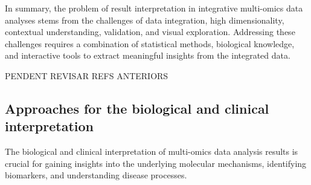 \documentclass[a4paper, nobind]{templates/ociamthesis}
\begin{document}
In summary, the problem of result interpretation in integrative multi-omics data analyses stems from the challenges of data integration, high dimensionality, contextual understanding, validation, and visual exploration. Addressing these challenges requires a combination of statistical methods, biological knowledge, and interactive tools to extract meaningful insights from the integrated data.

PENDENT REVISAR REFS ANTERIORS

\hypertarget{approaches-for-the-biological-and-clinical-interpretation}{%
\subsection{Approaches for the biological and clinical interpretation}\label{approaches-for-the-biological-and-clinical-interpretation}}

The biological and clinical interpretation of multi-omics data analysis results is crucial for gaining insights into the underlying molecular mechanisms, identifying biomarkers, and understanding disease processes.
\end{document}
